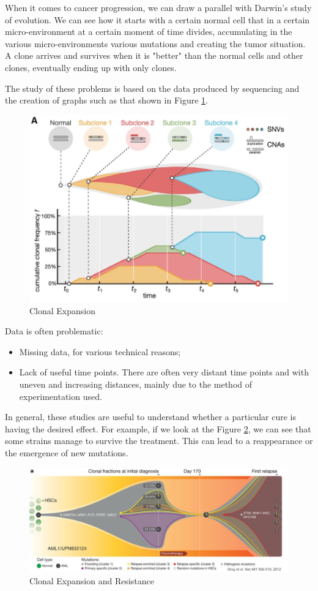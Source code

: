 When it comes to cancer progression, we can draw a parallel with Darwin’s study of evolution.
We can see how it starts with a certain normal cell that in a certain micro-environment at a
certain moment of time divides, accumulating in the various micro-environments various mutations
and creating the tumor situation. A clone arrives and survives when it is "better" than the
normal cells and other clones, eventually ending up with only clones.

The study of these problems is based on the data produced by sequencing and the creation of
graphs such as that shown in Figure \ref{fig:CE}.

\begin{figure}[!ht]
    \centering
    \includegraphics[width=0.5\linewidth]{img/CancerProgression/CE.png}
    \caption{Clonal Expansion}
    \label{fig:CE}
\end{figure}

Data is often problematic:
\begin{itemize}
    \item Missing data, for various technical reasons;
    \item Lack of useful time points. There are often very distant time points and with
          uneven and increasing distances, mainly due to the method of experimentation used.
\end{itemize}

In general, these studies are useful to understand whether a particular cure is having the desired effect. For example, if we look at the Figure \ref{fig:Resistance}, we can see that
some strains manage to survive the treatment. This can lead to a reappearance or the
emergence of new mutations.

\begin{figure}[!ht]
    \centering
    \includegraphics[width=0.5\linewidth]{img/CancerProgression/Resistance.png}
    \caption{Clonal Expansion and Resistance}
    \label{fig:Resistance}
\end{figure}

